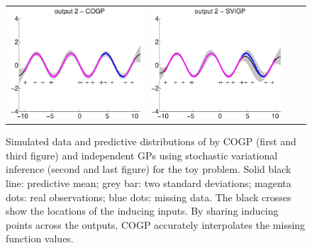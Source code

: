 \begin{figure}
\begin{tabular}{cccc}
\includegraphics[scale=0.2]{figures/toy-slfm-y2.eps} &
\includegraphics[scale=0.2]{figures/toy-svigp-y2.eps}
\end{tabular}
\caption{Simulated data and predictive distributions of by COGP (first and third figure) and independent GPs using stochastic variational inference (second and last figure) for the toy problem. Solid black line: predictive mean; grey bar: two standard deviations; magenta dots: real observations; blue dots: missing data. The black crosses show the locations of the inducing inputs. By sharing inducing points across the outputs, COGP accurately interpolates the missing function values.}
\label{fig:toy}
\end{figure}

